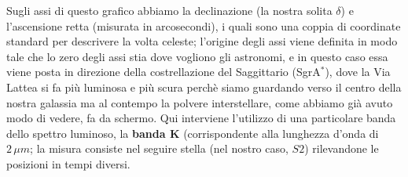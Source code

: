 Sugli assi di questo grafico abbiamo la declinazione (la nostra solita $\delta$) e l'ascensione retta (misurata in arcosecondi), i quali sono una coppia di coordinate standard per descrivere la volta celeste; l'origine degli assi viene definita in modo tale che lo zero degli assi stia dove vogliono gli astronomi, e in questo caso essa viene posta  in direzione della costrellazione del Saggittario (SgrA$^*$), dove la Via Lattea si fa più luminosa e più scura perchè siamo guardando verso il centro della nostra galassia ma al contempo la polvere interstellare, come abbiamo già avuto modo di vedere, fa da schermo. Qui interviene l'utilizzo di una particolare banda dello spettro luminoso, la \textbf{banda K} (corrispondente alla lunghezza d'onda di $2 \, \mu m$; la misura consiste nel seguire stella (nel nostro caso, $S2$) rilevandone le posizioni in tempi diversi. %
